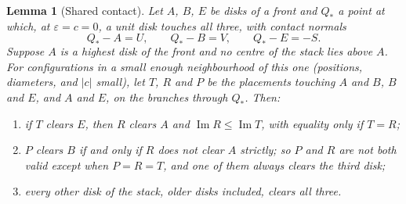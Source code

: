 \documentclass[11pt]{amsart}
\newtheorem{lemma}{Lemma}[section]
\theoremstyle{definition}
\newcommand{\eps}{\varepsilon}
\DeclareMathOperator{\Imag}{Im}
\begin{document}
\begin{lemma}[Shared contact]\label{lem:shared}
Let $A$, $B$, $E$ be disks of a front and $Q_*$ a point at which, at $\eps=c=0$, a unit disk touches all
three, with contact normals
\[
Q_*-A=U,\qquad Q_*-B=V,\qquad Q_*-E=-S.
\]
Suppose $A$ is a highest disk of the front and no centre of the stack lies above $A$. For configurations in a small enough neighbourhood of this
one (positions, diameters, and $|c|$ small), let $T$, $R$ and $P$ be the placements touching $A$ and $B$,
$B$ and $E$, and $A$ and $E$, on the branches through $Q_*$. Then:
\begin{enumerate}
\item[(a)] if $T$ clears $E$, then $R$ clears $A$ and $\Imag R\le\Imag T$, with equality only if $T=R$;
\item[(b)] $P$ clears $B$ if and only if $R$ does not clear $A$ strictly; so $P$ and $R$ are not both valid
except when $P=R=T$, and one of them always clears the third disk;
\item[(c)] every other disk of the stack, older disks included, clears all three.
\end{enumerate}
\end{lemma}
\end{document}
